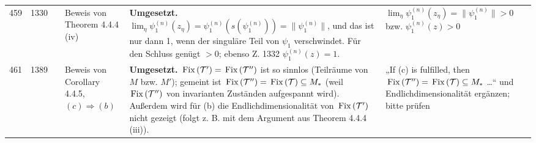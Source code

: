 \documentclass[10pt]{article}
\begin{document}
\begin{longtable}{@{}rrc>{\RaggedRight\arraybackslash}p{3.0cm}>{\RaggedRight\arraybackslash}p{11.4cm}>{\RaggedRight\arraybackslash}p{7.4cm}@{}}
459 & 1330 & \sichB{} & Beweis von Theorem 4.4.4 (iv) & \textbf{Umgesetzt.} $\lim_{\eta}\psi_{1}^{(n)}(z_{\eta}) = \psi_{1}^{(n)}(s(\psi_{1}^{(n)})) = \|\psi_{1}^{(n)}\|$, und das ist nur dann 1, wenn der singuläre Teil von $\psi_{1}$ verschwindet. Für den Schluss genügt $> 0$; ebenso Z. 1332 $\psi_{1}^{(n)}(z) = 1$. & $\lim_{\eta} \psi_{1}^{(n)}(z_{\eta}) = \|\psi_{1}^{(n)}\| > 0$ bzw. $\psi_{1}^{(n)}(z) > 0$ \\[2pt]
461 & 1389 & \sichB{} & Beweis von Corollary 4.4.5, $(c) \ensuremath{\Rightarrow} (b)$ & \textbf{Umgesetzt.} $\mathop{}\mathrm{Fix}\left(\mathcal{T}'\right) = \mathop{}\mathrm{Fix}\left(\mathcal{T}''\right)$ ist so sinnlos (Teilräume von $M$ bzw. $M'$); gemeint ist $\mathop{}\mathrm{Fix}\left(\mathcal{T}''\right) = \mathop{}\mathrm{Fix}\left(\mathcal{T}\right) \subseteq M_{*}$ (weil $\mathop{}\mathrm{Fix}\left(\mathcal{T}''\right)$ von invarianten Zuständen aufgespannt wird). Außerdem wird für (b) die Endlichdimensionalität von $\mathop{}\mathrm{Fix}\left(\mathcal{T}'\right)$ nicht gezeigt (folgt z. B. mit dem Argument aus Theorem 4.4.4 (iii)). & „If (c) is fulfilled, then $\mathop{}\mathrm{Fix}\left(\mathcal{T}''\right) = \mathop{}\mathrm{Fix}\left(\mathcal{T}\right) \subseteq M_{*}$ \dots{}“ und Endlichdimensionalität ergänzen; bitte prüfen \\
\end{longtable}
\end{document}
